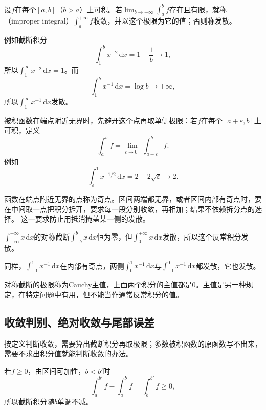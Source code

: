 设$f$在每个$[a,b]$（$b>a$）上可积。若$\lim_{b\to+\infty}\int_a^bf$存在且有限，就称（improper integral）$\int_a^{+\infty}f$收敛，并以这个极限为它的值；否则称发散。

例如截断积分
\[
 \int_1^bx^{-2}\,\mathrm dx=1-\frac1b\to1,
\]
所以$\int_1^\infty x^{-2}\,\mathrm dx=1$。而
\[
 \int_1^bx^{-1}\,\mathrm dx=\log b\to+\infty,
\]
所以$\int_1^\infty x^{-1}\,\mathrm dx$发散。

被积函数在端点附近无界时，先避开这个点再取单侧极限：若$f$在每个$[a+\varepsilon,b]$上可积，定义
\[
 \int_a^bf=\lim_{\varepsilon\to0^+}\int_{a+\varepsilon}^bf.
\]
例如
\[
 \int_\varepsilon^1x^{-1/2}\,\mathrm dx=2-2\sqrt\varepsilon\to2.
\]

函数在端点附近无界的点称为奇点。区间两端都无界，或者区间内部有奇点时，要在中间取一点把积分拆开，要求每一段分别收敛，再相加；结果不依赖拆分点的选择。
这一要求防止用抵消掩盖某一侧的发散。

\begin{example}[对称截断掩盖发散]
\label{ex:ru-symmetric-truncation}
$\int_{-\infty}^{+\infty}x\,\mathrm dx$的对称截断$\int_{-b}^bx\,\mathrm dx$恒为零，但$\int_0^{+\infty}x\,\mathrm dx$发散，所以这个反常积分发散。

同样，$\int_{-1}^1x^{-1}\,\mathrm dx$在内部有奇点，两侧$\int_0^1x^{-1}\,\mathrm dx$与$\int_{-1}^0x^{-1}\,\mathrm dx$都发散，它也发散。
\end{example}

对称截断的极限称为Cauchy主值，上面两个积分的主值都是$0$。主值是另一种规定，在特定问题中有用，但不能当作通常反常积分的值。

\subsection{收敛判别、绝对收敛与尾部误差}
\label{sec:ru-improper-tests}

按定义判断收敛，需要算出截断积分再取极限；多数被积函数的原函数写不出来，需要不求出积分值就能判断收敛的办法。

若$f\geq0$，由区间可加性，$b<b'$时
\[
 \int_a^{b'}f-\int_a^bf=\int_b^{b'}f\geq0,
\]
所以截断积分随$b$单调不减。


